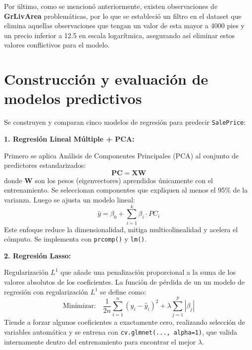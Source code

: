 \documentclass[a4paper,twocolumn]{article}
\begin{document}

	\vspace{0.2cm}

	Por último, como se mencionó anteriormente, existen observaciones de \textbf{GrLivArea} problemáticas, por lo que se estableció un filtro en el dataset que elimina aquellas
	observaciones que tengan un valor de esta mayor a 4000 pies y un precio inferior a 12.5 en escala logarítmica, asegurando así eliminar estos valores conflictivos para el modelo.


	\section{Construcción y evaluación de modelos predictivos}
	\label{sec:modelos}

	Se construyen y comparan cinco modelos de regresión para predecir \texttt{SalePrice}:

	\vspace{0.2cm}

	\textbf{1. Regresión Lineal Múltiple + PCA:}
	
	\vspace{0.2cm}

	Primero se aplica Análisis de Componentes Principales (PCA) al conjunto de predictores estandarizados:
	\[
	\mathbf{PC} = \mathbf{X} \mathbf{W}
	\]
	donde $\mathbf{W}$ son los pesos (eigenvectores) aprendidos únicamente con el entrenamiento. Se seleccionan componentes que expliquen al menos el 95\% de la varianza. Luego se ajusta un modelo lineal:
	\[
	\hat{y} = \beta_0 + \sum_{i=1}^{k} \beta_i \cdot PC_i
	\]
	Este enfoque reduce la dimensionalidad, mitiga multicolinealidad y acelera el cómputo. Se implementa con \texttt{prcomp()} y \texttt{lm()}.

	\vspace{0.2cm}

	\textbf{2. Regresión Lasso:}
	
	\vspace{0.2cm}

	Regularización $L^1$ que añade una penalización proporcional a la suma de los valores absolutos de los coeficientes. La función de pérdida de un un modelo de regresión con regularización $L^1$ se define como:
	\[
	\text{Minimizar:} \quad \frac{1}{2n} \sum_{i=1}^{n} (y_i - \hat{y}_i)^2 + \lambda \sum_{j=1}^{p} |\beta_j|
	\]
	Tiende a forzar algunos coeficientes a exactamente cero, realizando selección de variables automática y se entrena con \texttt{cv.glmnet(..., alpha=1)}, que valida internamente dentro del entrenamiento para encontrar el mejor $\lambda$.
\end{document}
